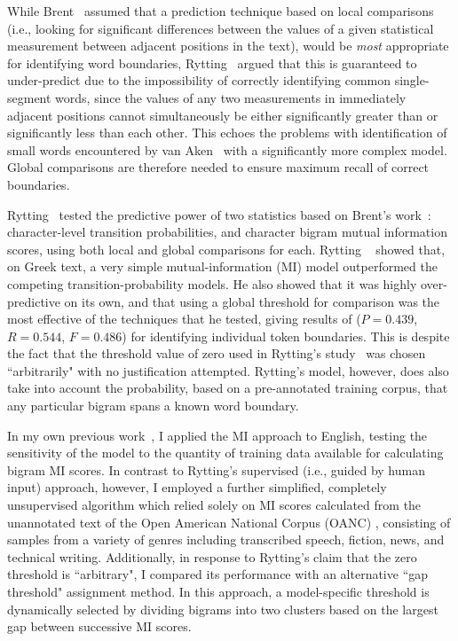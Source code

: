 While Brent~\cite{brent99} assumed that a prediction technique based on local comparisons (i.e., looking for significant differences between the values of a given statistical measurement between adjacent positions in the text), would be \textit{most} appropriate for identifying word boundaries, Rytting~\cite{rytting04} argued that this is guaranteed to under-predict due to the impossibility of correctly identifying common single-segment words, since the values of any two measurements in immediately adjacent positions cannot simultaneously be either significantly greater than or significantly less than each other. This echoes the problems with identification of small words encountered by van Aken~\cite{aken11} with a significantly more complex model. Global comparisons are therefore needed to ensure maximum recall of correct boundaries.

Rytting~\cite{rytting04} tested the predictive power of two statistics based on Brent's work~\cite{brent99}: character-level transition probabilities, and character bigram mutual information scores, using both local and global comparisons for each. Rytting ~\cite{rytting04} showed that, on Greek text, a very simple mutual-information (MI) model outperformed the competing transition-probability models. He also showed that it was highly over-predictive on its own, and that using a global threshold for comparison was the most effective of the techniques that he tested, giving results of ($P = 0.439$, $R = 0.544$, $F = 0.486$) for identifying individual token boundaries. This is despite the fact that the threshold value of zero used in Rytting's study~\cite{rytting04} was chosen ``arbitrarily" with no justification attempted. Rytting's model, however, does also take into account the probability, based on a pre-annotated training corpus, that any particular bigram spans a known word boundary.

In my own previous work~\cite{kearsley14}, I applied the MI approach to English, testing the sensitivity of the model to the quantity of training data available for calculating bigram MI scores. In contrast to Rytting's supervised (i.e., guided by human input) approach, however, I employed a further simplified, completely unsupervised algorithm which relied solely on MI scores calculated from the unannotated text of the Open American National Corpus (OANC) \cite{oanc}, consisting of samples from a variety of genres including transcribed speech, fiction, news, and technical writing. Additionally, in response to Rytting's claim that the zero threshold is ``arbitrary", I compared its performance with an alternative ``gap threshold" assignment method. In this approach, a model-specific threshold is dynamically selected by dividing bigrams into two clusters based on the largest gap between successive MI scores.

